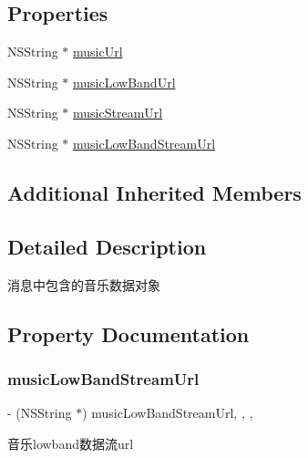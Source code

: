 \subsection*{Properties}
\begin{DoxyCompactItemize}
\item 
N\+S\+String $\ast$ \mbox{\hyperlink{interface_w_b_music_object_a3d68d45e9c8ba4db73bf2225697b762c}{music\+Url}}
\item 
N\+S\+String $\ast$ \mbox{\hyperlink{interface_w_b_music_object_a3171cc372068fe6381dbf92e1b9e3b81}{music\+Low\+Band\+Url}}
\item 
N\+S\+String $\ast$ \mbox{\hyperlink{interface_w_b_music_object_a8d15561b72b2037a38c9740b17661e2c}{music\+Stream\+Url}}
\item 
N\+S\+String $\ast$ \mbox{\hyperlink{interface_w_b_music_object_a43e67a7dcf687ea33dc1d0ff08e1d34a}{music\+Low\+Band\+Stream\+Url}}
\end{DoxyCompactItemize}
\subsection*{Additional Inherited Members}


\subsection{Detailed Description}
消息中包含的音乐数据对象 

\subsection{Property Documentation}
\mbox{\label{interface_w_b_music_object_a43e67a7dcf687ea33dc1d0ff08e1d34a}} 
\subsubsection{\texorpdfstring{music\+Low\+Band\+Stream\+Url}{musicLowBandStreamUrl}}
{\footnotesize\ttfamily -\/ (N\+S\+String $\ast$) music\+Low\+Band\+Stream\+Url\hspace{0.3cm}{\ttfamily [read]}, {\ttfamily [write]}, {\ttfamily [nonatomic]}, {\ttfamily [strong]}}

音乐lowband数据流url

